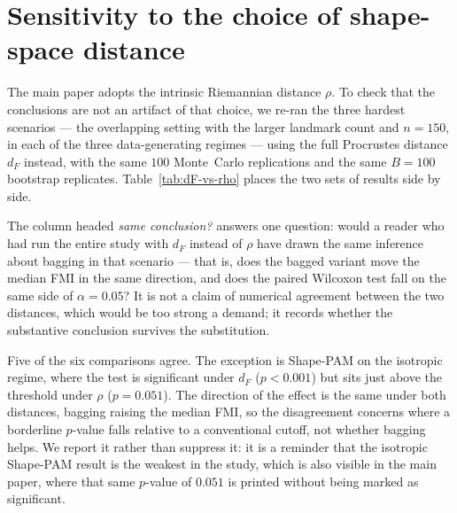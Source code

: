 \documentclass[11pt,a4paper]{article}
\begin{document}
\clearpage


\section{Sensitivity to the choice of shape-space distance}
\label{sec:dF-sensitivity}

The main paper adopts the intrinsic Riemannian distance $\rho$. To check that
the conclusions are not an artifact of that choice, we re-ran the three hardest
scenarios --- the overlapping setting with the larger landmark count and
$n=150$, in each of the three data-generating regimes --- using the full
Procrustes distance $d_F$ instead, with the same $100$ Monte~Carlo replications
and the same $B=100$ bootstrap replicates. Table~\ref{tab:dF-vs-rho} places the
two sets of results side by side.

The column headed \emph{same conclusion?} answers one question: would a reader
who had run the entire study with $d_F$ instead of $\rho$ have drawn the same
inference about bagging in that scenario --- that is, does the bagged variant
move the median FMI in the same direction, and does the paired Wilcoxon test
fall on the same side of $\alpha = 0.05$? It is not a claim of numerical
agreement between the two distances, which would be too strong a demand; it
records whether the substantive conclusion survives the substitution.

Five of the six comparisons agree. The exception is Shape-PAM on the isotropic
regime, where the test is significant under $d_F$ ($p<0.001$) but sits just
above the threshold under $\rho$ ($p=0.051$). The direction of the effect is the
same under both distances, bagging raising the median FMI, so the disagreement
concerns where a borderline $p$-value falls relative to a conventional cutoff,
not whether bagging helps. We report it rather than suppress it: it is a
reminder that the isotropic Shape-PAM result is the weakest in the study, which
is also visible in the main paper, where that same $p$-value of $0.051$ is
printed without being marked as significant.
\end{document}
